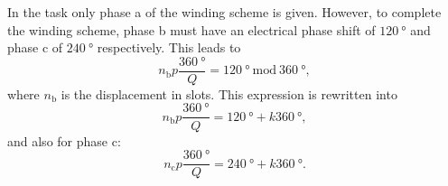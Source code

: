 \begin{solutionblock}
    In the task only phase a of the winding scheme is given. However, to complete the winding scheme, phase b must have an electrical phase shift of $\SI{120}{\degree}$ and phase c of $\SI{240}{\degree}$ respectively.
    This leads to
    \begin{equation}
        n_{\mathrm{b}} p \frac{\SI{360}{\degree}}{Q} = \SI{120}{\degree} \ \mathrm{mod} \ \SI{360}{\degree},
    \end{equation}
    where $n_{\mathrm{b}}$ is the displacement in slots. This expression is rewritten into
    \begin{equation}
        n_{\mathrm{b}} p \frac{\SI{360}{\degree}}{Q} = \SI{120}{\degree} + k \SI{360}{\degree},
        \label{eq:nb}
    \end{equation}
    and also for phase c:
    \begin{equation}
        n_{\mathrm{c}} p \frac{\SI{360}{\degree}}{Q} = \SI{240}{\degree} + k \SI{360}{\degree}.
        \label{eq:nc}
    \end{equation}
    

\end{solutionblock}
